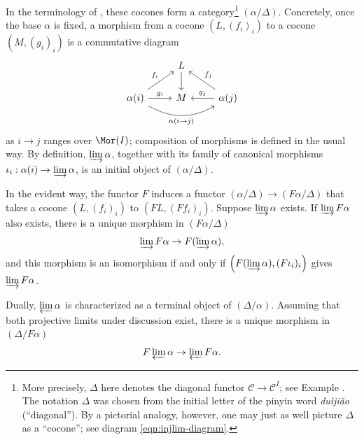 In the terminology of \cite[\S 2.7]{Li1}, these cocones form a
category\footnote{More precisely, $\Delta$ here denotes the diagonal functor
$\mathcal{C} \to \mathcal{C}^I$; see Example
. The notation $\Delta$ was chosen from
the initial letter of the pinyin word \emph{duìjiǎo} (``diagonal''). By a
pictorial analogy, however, one may just as well picture $\Delta$ as a
``cocone''; see
diagram \eqref{eqn:injlim-diagram}.} $(\alpha / \Delta)$. Concretely, once the
base $\alpha$ is fixed, a morphism from a cocone $(L, (f_i)_i)$ to a cocone
$(M, (g_i)_i)$ is a commutative diagram
\begin{equation}\label{eqn:injlim-diagram}\begin{tikzcd}
	& L \arrow[d] & \\
	\alpha(i) \arrow[bend right, rr, "\alpha(i \to j)"'] \arrow[r, "g_i"] \arrow[ru, "f_i"] & M & \alpha(j) \arrow[l, "{g_j}"'] \arrow[lu, "f_j"']
\end{tikzcd}\end{equation}
as $i \to j$ ranges over $\Mor(I)$; composition of morphisms is defined in
the usual way. By definition, $\varinjlim \alpha$, together with its family
of canonical morphisms $\iota_i: \alpha(i) \to \varinjlim \alpha$, is an
initial object of $(\alpha / \Delta)$.

In the evident way, the functor $F$ induces a functor
$(\alpha/\Delta) \to (F\alpha / \Delta)$ that takes a cocone
$(L, (f_i)_i)$ to $(FL, (Ff_i)_i)$. Suppose $\varinjlim \alpha$ exists. If
$\varinjlim F\alpha$ also exists, there is a unique morphism in
$(F\alpha / \Delta)$
\[ \varinjlim F\alpha \to F(\varinjlim \alpha), \]
and this morphism is an isomorphism if and only if
$\left( F(\varinjlim \alpha), (F\iota_i)_i \right)$ gives
$\varinjlim F\alpha$.

Dually, $\varprojlim \alpha$ is characterized as a terminal object of
$(\Delta/\alpha)$. Assuming that both projective limits under discussion
exist, there is a unique morphism in $(\Delta/F\alpha)$
\[ F\varprojlim \alpha \to \varprojlim F\alpha. \]

